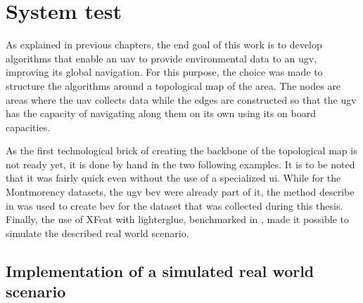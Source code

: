 \chapter{System test}


%
%
%
%

As explained in previous chapters, the end goal of this work is to develop algorithms that enable an \gls{uav} to
provide environmental data to an \gls{ugv}, improving its global navigation.
For this purpose, the choice was made to structure the algorithms around a topological map of the area.
The nodes are areas where the \gls{uav} collects data while the edges are constructed so that the \gls{ugv}
has the capacity of navigating along them on its own using its on board capacities.

As the first technological brick of creating the backbone of the topological map is not ready yet, it is done by hand in the two following examples.
It is to be noted that it was fairly quick even without the use of a specialized \gls{ui}.
While for the Montmorency datasets, the \gls{ugv} \gls{bev} were already part of it, the method describe in  was
used to create \gls{bev} for the dataset that was collected during this thesis.
Finally, the use of XFeat with lighterglue, benchmarked in ,
made it possible to simulate the described real world scenario.


\section{Implementation of a simulated real world scenario}\label{sec:implementation-of-a-simulated-real-world-scenario}

